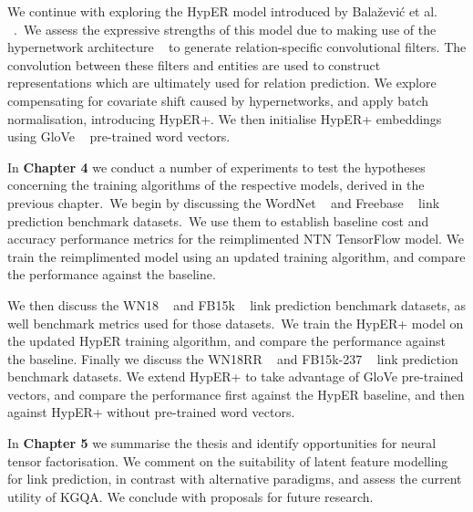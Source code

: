 \noindent We continue with exploring the HypER model introduced by Bala\v{z}evi\'c et al. \unskip ~\citep{balazevic2019hypernetwork}.\ We assess the expressive strengths of this model due to making use of the hypernetwork architecture \unskip ~\citep{ha2016hypernetworks} to generate relation-specific convolutional filters. The convolution between these filters and entities are used to construct representations which are ultimately used for relation prediction. We explore compensating for covariate shift caused by hypernetworks, and apply batch normalisation, introducing HypER+. We then initialise HypER+ embeddings using GloVe \unskip~\citep{pennington2014glove} pre-trained word vectors. \par

\noindent In \textbf{Chapter 4} we conduct a number of experiments to test the hypotheses concerning the training algorithms of the respective models, derived in the previous chapter.\ We begin by discussing the WordNet \unskip ~\citep{miller1995wordnet} and Freebase \unskip ~\citep{bollacker2008freebase} link prediction benchmark datasets.\ We use them to establish baseline cost and accuracy performance metrics for the reimplimented NTN TensorFlow model. We train the reimplimented model using an updated training algorithm, and compare the performance against the baseline. \par

\noindent We then discuss the WN18 \unskip ~\citep{bordes2014semantic} and FB15k \unskip ~\citep{bordes2013translating} link prediction benchmark datasets, as well benchmark metrics used for those datasets.\ We train the HypER+ model on the updated HypER training algorithm, and compare the performance against the baseline. Finally we discuss the WN18RR \unskip ~\citep{dettmers2018convolutional} and FB15k-237 \unskip ~\citep{toutanova2015observed} link prediction benchmark datasets. We extend HypER+ to take advantage of GloVe pre-trained vectors, and  compare the performance first against the HypER baseline, and then against HypER+ without pre-trained word vectors. \par

\noindent In \textbf{Chapter 5} we summarise the thesis and identify opportunities for neural tensor factorisation. We comment on the suitability of latent feature modelling for link prediction, in contrast with alternative paradigms, and assess the current utility of KGQA. We conclude with proposals for future research.

